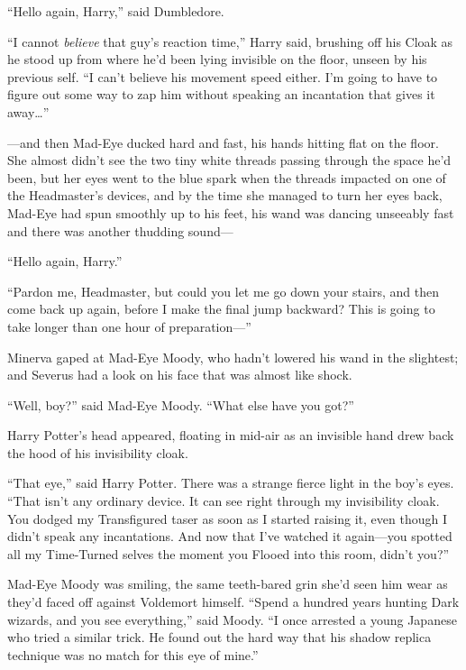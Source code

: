 \later

“Hello again, Harry,” said Dumbledore.

“I cannot \emph{believe} that guy’s reaction time,” Harry said, brushing off his Cloak as he stood up from where he’d been lying invisible on the floor, unseen by his previous self. “I can’t believe his movement speed either. I’m going to have to figure out some way to zap him without speaking an incantation that gives it away…”

\later

—and then Mad-Eye ducked hard and fast, his hands hitting flat on the floor. She almost didn’t see the two tiny white threads passing through the space he’d been, but her eyes went to the blue spark when the threads impacted on one of the Headmaster’s devices, and by the time she managed to turn her eyes back, Mad-Eye had spun smoothly up to his feet, his wand was dancing unseeably fast and there was another thudding sound—

\later

“Hello again, Harry.”

“Pardon me, Headmaster, but could you let me go down your stairs, and then come back up again, before I make the final jump backward? This is going to take longer than one hour of preparation—”

\later

Minerva gaped at Mad-Eye Moody, who hadn’t lowered his wand in the slightest; and Severus had a look on his face that was almost like shock.

“Well, boy?” said Mad-Eye Moody. “What else have you got?”

Harry Potter’s head appeared, floating in mid-air as an invisible hand drew back the hood of his invisibility cloak.

“That eye,” said Harry Potter. There was a strange fierce light in the boy’s eyes. “That isn’t any ordinary device. It can see right through my invisibility cloak. You dodged my Transfigured taser as soon as I started raising it, even though I didn’t speak any incantations. And now that I’ve watched it again—you spotted all my Time-Turned selves the moment you Flooed into this room, didn’t you?”

Mad-Eye Moody was smiling, the same teeth-bared grin she’d seen him wear as they’d faced off against Voldemort himself. “Spend a hundred years hunting Dark wizards, and you see everything,” said Moody. “I once arrested a young Japanese who tried a similar trick. He found out the hard way that his shadow replica technique was no match for this eye of mine.”

